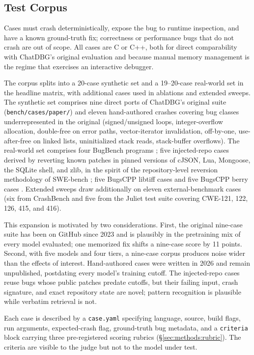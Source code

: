 \documentclass[11pt]{article}
\begin{document}
\subsection{Test Corpus}
\label{sec:methods:corpus}

Cases must crash deterministically, expose the bug to runtime inspection, and have a known ground-truth fix; correctness or performance bugs that do not crash are out of scope. All cases are C or C++, both for direct comparability with ChatDBG's original evaluation and because manual memory management is the regime that exercises an interactive debugger.

The corpus splits into a 20-case synthetic set and a 19--20-case real-world set in the headline matrix, with additional cases used in ablations and extended sweeps. The synthetic set comprises nine direct ports of ChatDBG's original suite (\texttt{bench/cases/paper/}) and eleven hand-authored crashes covering bug classes underrepresented in the original (signed/unsigned loops, integer-overflow allocation, double-free on error paths, vector-iterator invalidation, off-by-one, use-after-free on linked lists, uninitialized stack reads, stack-buffer overflows). The real-world set comprises four BugBench programs \citep{lu2005bugbench}; five injected-repo cases derived by reverting known patches in pinned versions of cJSON, Lua, Mongoose, the SQLite shell, and zlib, in the spirit of the repository-level reversion methodology of SWE-bench \citep{jimenez2024swebench}; five BugsCPP libtiff cases and five BugsCPP berry cases \citep{an2023bugscpp}. Extended sweeps draw additionally on eleven external-benchmark cases (six from CrashBench \citep{ortega2024crashbench} and five from the Juliet test suite \citep{juliet2017} covering CWE-121, 122, 126, 415, and 416).

This expansion is motivated by two considerations. First, the original nine-case suite has been on GitHub since 2023 and is plausibly in the pretraining mix of every model evaluated; one memorized fix shifts a nine-case score by 11 points. Second, with five models and four tiers, a nine-case corpus produces noise wider than the effects of interest. Hand-authored cases were written in 2026 and remain unpublished, postdating every model's training cutoff. The injected-repo cases reuse bugs whose public patches predate cutoffs, but their failing input, crash signature, and exact repository state are novel; pattern recognition is plausible while verbatim retrieval is not.

Each case is described by a \texttt{case.yaml} specifying language, source, build flags, run arguments, expected-crash flag, ground-truth bug metadata, and a \texttt{criteria} block carrying three pre-registered scoring rubrics (\S\ref{sec:methods:rubric}). The criteria are visible to the judge but not to the model under test.
\end{document}
